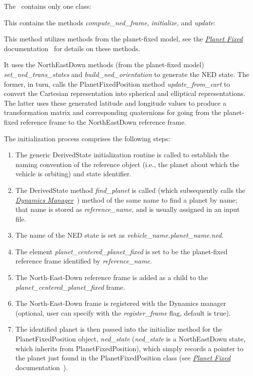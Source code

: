 The \NEDDesc\ contains only one class:
\begin{itemize}

This contains the methods \textit{compute\_ned\_frame}, \textit{initialize}, and \textit{update}:
\begin{enumerate}

This method utilizes methods from the planet-fixed model, see the \href{file:\JEODHOME/models/utils/planet\_fixed/docs/planet\_fixed.pdf}{\em Planet Fixed} documentation~\cite{dynenv:PLANETFIXED} for details on these methods.

It uses the NorthEastDown methods (from the planet-fixed model) \textit{set\_ned\_trans\_states} and \textit{build\_ned\_orientation} to generate the NED state.  The former, in turn, calls the PlanetFixedPosition method \textit{update\_from\_cart} to convert the Cartesian representation into spherical and elliptical representations.  The latter uses these generated latitude and longitude values to  produce a transformation matrix and corresponding quaternions for going from the planet-fixed reference frame to the NorthEastDown reference frame.

The initialization process comprises the following steps:
\begin{enumerate}
\item{} The generic DerivedState initialization routine is called to establish the naming convention of the reference object (i.e., the planet about which the vehicle is orbiting) and state identifier.
\item{} The DerivedState method \textit{find\_planet} is called (which subsequently calls the  \href{file:\JEODHOME/models/dynamics/dyn_manager/docs/dyn_manager.pdf}{\em Dynamics Manager}~\cite{dynenv:DYNMANAGER}) method of the same name to find a planet by name; that name is stored as \textit{reference\_name}, and is usually assigned in an input file.
\item{} The name of the NED state is set as \textit{vehicle\_name.planet\_name.ned}.
\item{} The element \textit{planet\_centered\_planet\_fixed} is set to be the planet-fixed reference frame identified by \textit{reference\_name}.
\item{} The North-East-Down reference frame is added as a child to the \textit{planet\_centered\_planet\_fixed} frame.
\item{} The North-East-Down frame is registered with the Dynamics manager (optional, user can specify with the \textit{register\_frame} flag, default is true).
\item {} The identified planet is then passed into the initialize method for the PlanetFixedPosition object, \textit{ned\_state} (\textit{ned\_state} is a NorthEastDown state, which inherits from PlanetFixedPosition), which simply records a pointer to the planet just found in the PlanetFixedPosition class (see \href{file:\JEODHOME/models/utils/planet\_fixed/docs/planet\_fixed.pdf}{\em Planet Fixed} documentation~\cite{dynenv:PLANETFIXED}).
\end{enumerate}


\end{enumerate}
\end{itemize}
